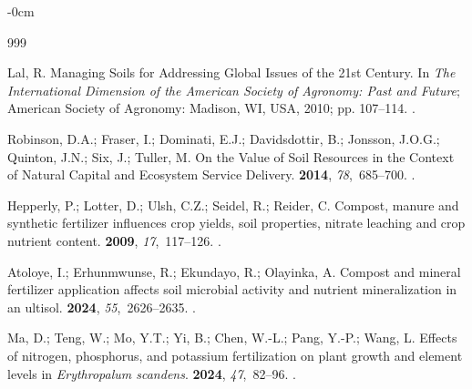 \documentclass[environremediat,article,accept,pdftex,oneauthor]{Definitions/mdpi}
\begin{document}
\begin{adjustwidth}{-\extralength}{0cm}


\begin{thebibliography}{999}

Lal, R.
\newblock Managing Soils for Addressing Global Issues of the 21st Century. In
  {\em The International Dimension of the American Society of Agronomy: Past
  and Future}; American Society of Agronomy: Madison, WI, USA, %
  2010; pp. 107--114.
.

Robinson, D.A.; Fraser, I.; Dominati, E.J.; Davidsdottir, B.; Jonsson, J.O.G.;
  Quinton, J.N.; Six, J.; Tuller, M.
\newblock On the Value of Soil Resources in the Context of Natural Capital and
  Ecosystem Service Delivery.
 {\bf 2014}, {\em
  78},~685--700.
.

Hepperly, P.; Lotter, D.; Ulsh, C.Z.; Seidel, R.; Reider, C.
\newblock Compost, manure and synthetic fertilizer influences crop yields, soil
  properties, nitrate leaching and crop nutrient content.
 {\bf 2009}, {\em 17},~117--126.
.

Atoloye, I.; Erhunmwunse, R.; Ekundayo, R.; Olayinka, A.
\newblock Compost and mineral fertilizer application affects soil microbial
  activity and nutrient mineralization in an ultisol.
 {\bf 2024},
  {\em 55},~2626--2635.
.

Ma, D.; Teng, W.; Mo, Y.T.;  Yi, B.; Chen, W.-L.; Pang, Y.-P.; Wang, L. %
\newblock Effects of nitrogen, phosphorus, and potassium fertilization on plant
  growth and element levels in \textit{Erythropalum scandens}.
 {\bf 2024}, {\em 47},~82--96.
.


\end{thebibliography}
\end{adjustwidth}
\end{document}
